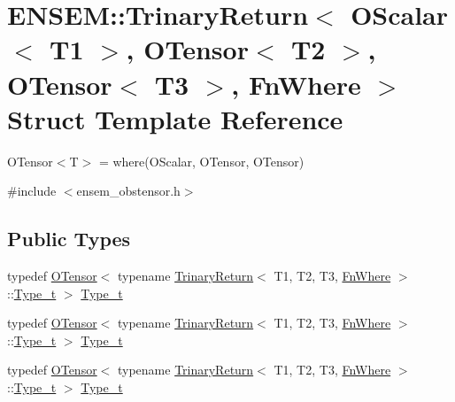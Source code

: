 \hypertarget{structENSEM_1_1TrinaryReturn_3_01OScalar_3_01T1_01_4_00_01OTensor_3_01T2_01_4_00_01OTensor_3_01T3_01_4_00_01FnWhere_01_4}{}\section{E\+N\+S\+EM\+:\+:Trinary\+Return$<$ O\+Scalar$<$ T1 $>$, O\+Tensor$<$ T2 $>$, O\+Tensor$<$ T3 $>$, Fn\+Where $>$ Struct Template Reference}
\label{structENSEM_1_1TrinaryReturn_3_01OScalar_3_01T1_01_4_00_01OTensor_3_01T2_01_4_00_01OTensor_3_01T3_01_4_00_01FnWhere_01_4}


O\+Tensor$<$\+T$>$ = where(\+O\+Scalar, O\+Tensor, O\+Tensor)  




{\ttfamily \#include $<$ensem\+\_\+obstensor.\+h$>$}

\subsection*{Public Types}
\begin{DoxyCompactItemize}
\item 
typedef \mbox{\hyperlink{classENSEM_1_1OTensor}{O\+Tensor}}$<$ typename \mbox{\hyperlink{structENSEM_1_1TrinaryReturn}{Trinary\+Return}}$<$ T1, T2, T3, \mbox{\hyperlink{structENSEM_1_1FnWhere}{Fn\+Where}} $>$\+::\mbox{\hyperlink{structENSEM_1_1TrinaryReturn_3_01OScalar_3_01T1_01_4_00_01OTensor_3_01T2_01_4_00_01OTensor_3_01T3_01_4_00_01FnWhere_01_4_a02a18159de516aef1fec4c120dcfd91d}{Type\+\_\+t}} $>$ \mbox{\hyperlink{structENSEM_1_1TrinaryReturn_3_01OScalar_3_01T1_01_4_00_01OTensor_3_01T2_01_4_00_01OTensor_3_01T3_01_4_00_01FnWhere_01_4_a02a18159de516aef1fec4c120dcfd91d}{Type\+\_\+t}}
\item 
typedef \mbox{\hyperlink{classENSEM_1_1OTensor}{O\+Tensor}}$<$ typename \mbox{\hyperlink{structENSEM_1_1TrinaryReturn}{Trinary\+Return}}$<$ T1, T2, T3, \mbox{\hyperlink{structENSEM_1_1FnWhere}{Fn\+Where}} $>$\+::\mbox{\hyperlink{structENSEM_1_1TrinaryReturn_3_01OScalar_3_01T1_01_4_00_01OTensor_3_01T2_01_4_00_01OTensor_3_01T3_01_4_00_01FnWhere_01_4_a02a18159de516aef1fec4c120dcfd91d}{Type\+\_\+t}} $>$ \mbox{\hyperlink{structENSEM_1_1TrinaryReturn_3_01OScalar_3_01T1_01_4_00_01OTensor_3_01T2_01_4_00_01OTensor_3_01T3_01_4_00_01FnWhere_01_4_a02a18159de516aef1fec4c120dcfd91d}{Type\+\_\+t}}
\item 
typedef \mbox{\hyperlink{classENSEM_1_1OTensor}{O\+Tensor}}$<$ typename \mbox{\hyperlink{structENSEM_1_1TrinaryReturn}{Trinary\+Return}}$<$ T1, T2, T3, \mbox{\hyperlink{structENSEM_1_1FnWhere}{Fn\+Where}} $>$\+::\mbox{\hyperlink{structENSEM_1_1TrinaryReturn_3_01OScalar_3_01T1_01_4_00_01OTensor_3_01T2_01_4_00_01OTensor_3_01T3_01_4_00_01FnWhere_01_4_a02a18159de516aef1fec4c120dcfd91d}{Type\+\_\+t}} $>$ \mbox{\hyperlink{structENSEM_1_1TrinaryReturn_3_01OScalar_3_01T1_01_4_00_01OTensor_3_01T2_01_4_00_01OTensor_3_01T3_01_4_00_01FnWhere_01_4_a02a18159de516aef1fec4c120dcfd91d}{Type\+\_\+t}}
\end{DoxyCompactItemize}


